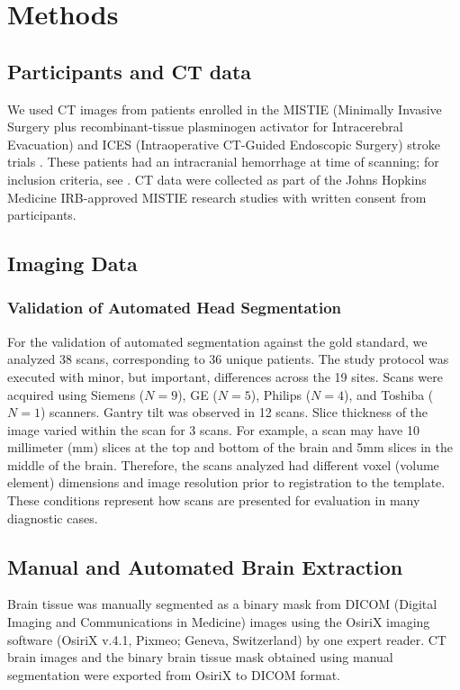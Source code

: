 \documentclass{elsarticle}\usepackage[]{graphicx}\usepackage[]{color}
\begin{document}
\section{Methods}
\subsection{ Participants and CT data}
We used CT images from patients enrolled in the MISTIE (Minimally Invasive Surgery plus recombinant-tissue plasminogen activator for Intracerebral Evacuation) and ICES (Intraoperative CT-Guided Endoscopic Surgery) stroke trials \citep{morgan_preliminary_2008}.  These patients had an intracranial hemorrhage at time of scanning; for inclusion criteria, see \citet{mould_minimally_2013}.   CT data were collected as part of the Johns Hopkins Medicine IRB-approved MISTIE research studies with written consent from participants.  


\subsection{Imaging Data}
\subsubsection{Validation of Automated Head Segmentation}
For the validation of automated segmentation against the gold standard, we analyzed 38 scans, corresponding to 36 unique patients.  The study protocol was executed with minor, but important, differences across the 19 sites.  Scans were acquired using Siemens ($N=9$), GE ($N=5$), Philips ($N=4$), and Toshiba ($N=1$) scanners. Gantry tilt was observed in 12 scans.  Slice thickness of the image varied within the scan for 3 scans. For example, a scan may have 10 millimeter (mm) slices at the top and bottom of the brain and 5mm slices in the middle of the brain.  Therefore, the scans analyzed had different voxel (volume element) dimensions and image resolution prior to registration to the template.  These conditions represent how scans are presented for evaluation in many diagnostic cases.  



\subsection{Manual and Automated Brain Extraction}
Brain tissue was manually segmented as a binary mask from DICOM (Digital Imaging and Communications in Medicine) images using the OsiriX imaging software (OsiriX v.4.1, Pixmeo; Geneva, Switzerland) by one expert reader. 
CT brain images and the binary brain tissue mask obtained using manual segmentation were exported from OsiriX to DICOM format.  
\end{document}
